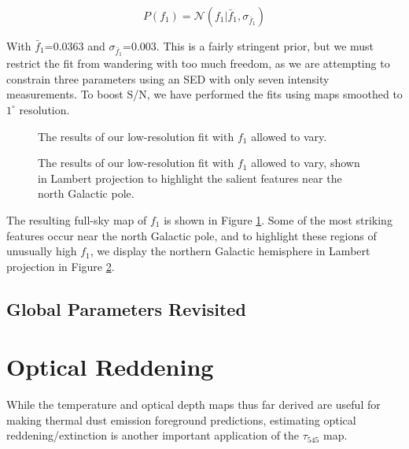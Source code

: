 \documentclass{emulateapj}
\begin{document}
\begin{equation} \label{equ:f1prior}
P(f_1) = \mathcal{N}(f_1|\bar{f}_1, \sigma_{\bar{f}_1})
\end{equation}

With $\bar{f}_1$=0.0363 and $\sigma_{\bar{f}_1}$=0.003. This is a fairly
stringent prior, but we must restrict the fit from wandering with too much
freedom, as we are attempting to constrain three parameters using an SED
with only seven intensity measurements. To boost S/N, we have performed
the fits using maps smoothed to $1^{\circ}$ resolution.

\begin{figure}
\begin{center}
\caption{\label{fig:f1} The results of our low-resolution fit with $f_1$
allowed to vary.}
\end{center}
\end{figure}

\begin{figure}
\begin{center}
\caption{\label{fig:f1lambert} The results of our low-resolution fit with $f_1$
allowed to vary, shown in Lambert projection to highlight the salient features 
near the north Galactic pole.}
\end{center}
\end{figure}

The resulting full-sky map of $f_1$ is shown in Figure \ref{fig:f1}. Some of 
the most striking features occur near the north Galactic pole, and to 
highlight these regions of unusually high $f_1$, we display the northern
Galactic hemisphere in Lambert projection in Figure \ref{fig:f1lambert}.
 

\subsection{Global Parameters Revisited}

\section{Optical Reddening}
\label{sec:ebv}

While the temperature and optical depth maps thus far derived are
useful for making thermal dust emission foreground predictions, estimating 
optical reddening/extinction is another important application of the 
$\tau_{545}$ map. 
\end{document}
